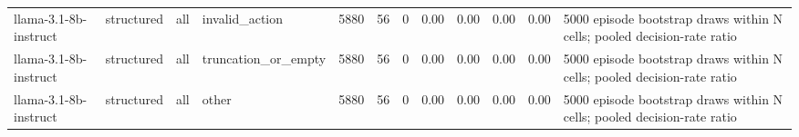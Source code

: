 \begin{tabular}{llllrrrrrrrl}
llama-3.1-8b-instruct & structured & all & invalid\_action & 5880 & 56 & 0 & 0.00 & 0.00 & 0.00 & 0.00 & 5000 episode bootstrap draws within N cells; pooled decision-rate ratio \\
llama-3.1-8b-instruct & structured & all & truncation\_or\_empty & 5880 & 56 & 0 & 0.00 & 0.00 & 0.00 & 0.00 & 5000 episode bootstrap draws within N cells; pooled decision-rate ratio \\
llama-3.1-8b-instruct & structured & all & other & 5880 & 56 & 0 & 0.00 & 0.00 & 0.00 & 0.00 & 5000 episode bootstrap draws within N cells; pooled decision-rate ratio \\
\bottomrule
\end{tabular}

